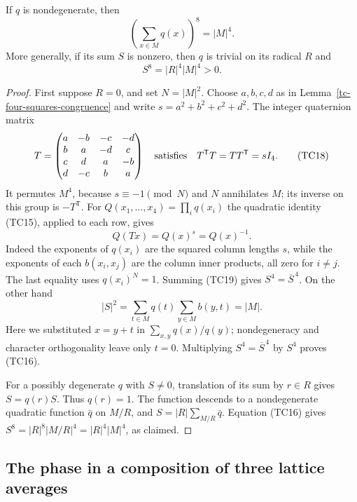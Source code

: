 \begin{theorem}\label{tc-gauss-eight}
If $q$ is nondegenerate, then
\[
                    \left(\sum_{x\in M}q(x)\right)^8=|M|^4.
 \tag{TC16}
\]
More generally, if its sum $S$ is nonzero, then $q$ is trivial
on its radical $R$ and
\[
                         S^8=|R|^4|M|^4>0.
 \tag{TC17}
\]
\end{theorem}
\begin{proof}
First suppose $R=0$, and set $N=|M|^2$.
Choose $a,b,c,d$ as in Lemma~\ref{tc-four-squares-congruence}
and write $s=a^2+b^2+c^2+d^2$.
The integer quaternion matrix
\[
 T=\begin{pmatrix}
 a&-b&-c&-d\\
 b&a&-d&c\\
 c&d&a&-b\\
 d&-c&b&a
 \end{pmatrix}
 \quad\hbox{satisfies}\quad
                  T^{\mathsf T}T=TT^{\mathsf T}=sI_4.
 \tag{TC18}
\]
It permutes $M^4$, because $s\equiv-1\pmod N$ and
$N$ annihilates $M$; its inverse on this group is
$-T^{\mathsf T}$.
For $Q(x_1,\ldots,x_4)=\prod_iq(x_i)$ the quadratic
identity (TC15), applied to each row, gives
\[
                         Q(Tx)=Q(x)^s=Q(x)^{-1}.
 \tag{TC19}
\]
Indeed the exponents of $q(x_i)$ are the squared column
lengths $s$, while the exponents of each $b(x_i,x_j)$
are the column inner products, all zero for $i\ne j$.
The last equality uses $q(x_i)^N=1$.
Summing (TC19) gives $S^4=\overline S^{\,4}$.
On the other hand
\[
 |S|^2
  =\sum_{t\in M}q(t)\sum_{y\in M}b(y,t)=|M|.
 \tag{TC20}
\]
Here we substituted $x=y+t$ in $\sum_{x,y}q(x)/q(y)$;
nondegeneracy and character orthogonality leave only $t=0$.
Multiplying $S^4=\overline S^{\,4}$ by $S^4$ proves (TC16).

For a possibly degenerate $q$ with $S\ne0$, translation
of its sum by $r\in R$ gives $S=q(r)S$.
Thus $q(r)=1$.  The function descends to a nondegenerate
quadratic function $\bar q$ on $M/R$, and
$S=|R|\sum_{M/R}\bar q$.
Equation (TC16) gives
$S^8=|R|^8|M/R|^4=|R|^4|M|^4$, as claimed.
\end{proof}

\subsection{The phase in a composition of three lattice averages}

